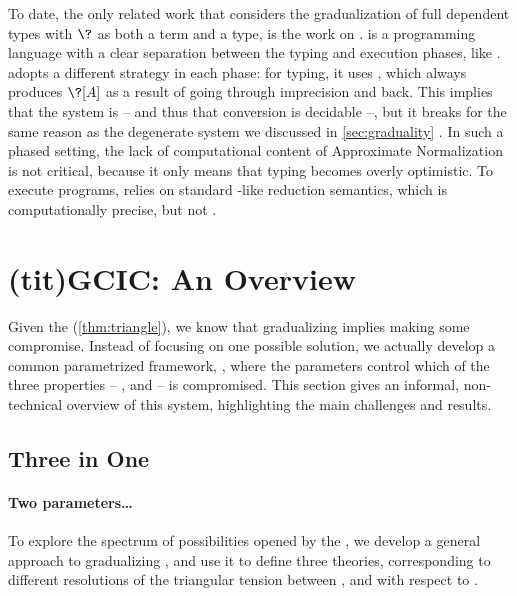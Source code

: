 \AP To date, the only related work that considers
the gradualization of full dependent types with
$\?$ as both a term and a type, is the work on  .
 is a programming language with a clear separation between the typing and execution 
phases, like  .
 adopts a different strategy in each phase:
for typing, it uses , which always produces $\?[A]$ as a result
of going through imprecision and back. This implies that the system is  – and thus that conversion is decidable –, but it breaks  for the same reason as the
degenerate system we discussed in \cref{sec:graduality}%
.
In such a phased setting, the lack of computational content of Approximate Normalization is not
critical, because it only means that typing becomes overly optimistic.
To execute programs,  relies on standard -like reduction semantics,
which is computationally precise, but not .

\section{\kl(tit){GCIC}: An Overview}
\label{sec:gcic-overview}

Given the  (\cref{thm:triangle}),
we know that gradualizing  implies making some compromise.
Instead of focusing on one possible solution, we actually develop
a common parametrized framework, , where the parameters control
which of the three properties – ,  and  –
is compromised. 
This section gives an informal, non-technical overview of this system,
highlighting the main challenges and results.

\subsection{Three in One}
\label{sec:gcic:-3-1}

\paragraph{Two parameters…}

To explore the spectrum of possibilities opened by the ,
we develop a general approach to gradualizing , and use it to define three theories, corresponding to different resolutions of the triangular tension between ,  and  with respect to .

